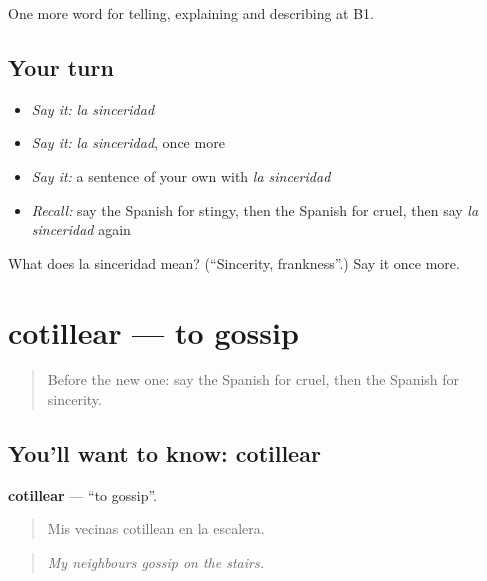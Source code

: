 \begin{grammarlens}[title={What you've built}]
One more word for telling, explaining and describing at B1.
\end{grammarlens}

\subsection*{Your turn}
\begin{itemize}
\raggedright
  \item \emph{Say it:} \emph{la sinceridad}
  \item \emph{Say it:} \emph{la sinceridad}, once more
  \item \emph{Say it:} a sentence of your own with \emph{la sinceridad}
  \item \emph{Recall:} say the Spanish for stingy, then the Spanish for cruel, then say \emph{la sinceridad} again
\end{itemize}

\begin{tcolorbox}[breakable,colback=teal!4,colframe=teal!35!black,title={Before you move on}]
What does la sinceridad mean? (\textquotedblleft{}Sincerity, frankness\textquotedblright{}.) Say it once more.
\end{tcolorbox}
\section[cotillear]{cotillear — to gossip}

\label{lesson:ES-C724-cotillear}



\begin{quote}
Before the new one: say the Spanish for cruel, then the Spanish for sincerity.
\end{quote}

\subsection*{You'll want to know: cotillear}
\textbf{cotillear} — \textquotedblleft{}to gossip\textquotedblright{}.

\begin{quote}
Mis vecinas cotillean en la escalera.
\end{quote}

\begin{quote}
\emph{My neighbours gossip on the stairs.}
\end{quote}

